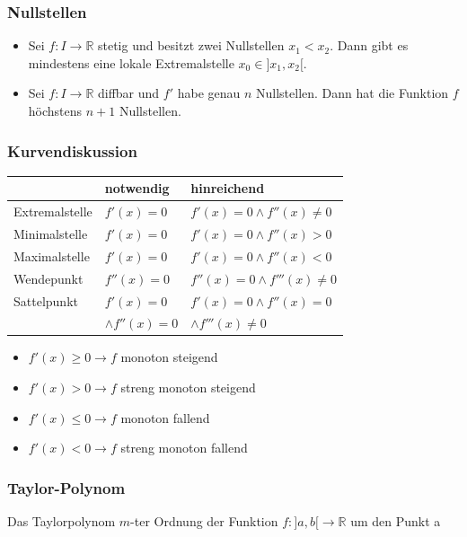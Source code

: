 \documentclass[6pt]{article}
\begin{document}
\begin{multicols*}{3}
	
	\subsubsection*{Nullstellen}
		\begin{itemize}[itemsep=2pt, parsep=3pt]
			\item Sei $f: I \to \mathbb{R}$ stetig und besitzt zwei Nullstellen $x_1 < x_2$. Dann gibt es mindestens eine lokale Extremalstelle $x_0 \in ]x_1,x_2[$.
			\item Sei $f: I \to \mathbb{R}$ diffbar und $f'$ habe genau $n$ Nullstellen. Dann hat die Funktion $f$ h{\"o}chstens $n+1$ Nullstellen.
		\end{itemize}
	
	
	\subsubsection*{Kurvendiskussion}
		\begin{tabular}{lll}
		& notwendig & hinreichend \\ \hline
		Extremalstelle  & $f'(x) = 0$  \hspace{5mm} & $f'(x) = 0 \wedge f''(x) \neq 0$ \\
		Minimalstelle   & $f'(x) = 0 $ & $f'(x) = 0 \wedge  f''(x) > 0$\\
		Maximalstelle   & $f'(x) = 0 $ & $f'(x) = 0 \wedge  f''(x) < 0$ \\
		Wendepunkt      & $f''(x) = 0 $ & $f''(x) = 0 \wedge  f'''(x) \neq 0$ \\
		Sattelpunkt     & $f'(x) = 0 $ & $f'(x) = 0 \wedge  f''(x) = 0$ \\
								&$\wedge  f''(x) = 0$	& $\wedge  f'''(x) \neq 0$
	\end{tabular}

	\begin{itemize}[itemsep=1pt, parsep=2pt]
		\item $f'(x) \geq  0 \rightarrow f $ monoton steigend
		\item $f'(x) > 0 \rightarrow f $ streng monoton steigend
		\item $f'(x) \leq 0 \rightarrow f $ monoton fallend
		\item $f'(x) < 0 \rightarrow f $ streng monoton fallend 
	\end{itemize}



	\subsubsection*{Taylor-Polynom}
		Das Taylorpolynom $m$-ter Ordnung der Funktion $f:]a,b[ \to \mathbb{R}$ um den Punkt a
		


\end{multicols*}
\end{document}
